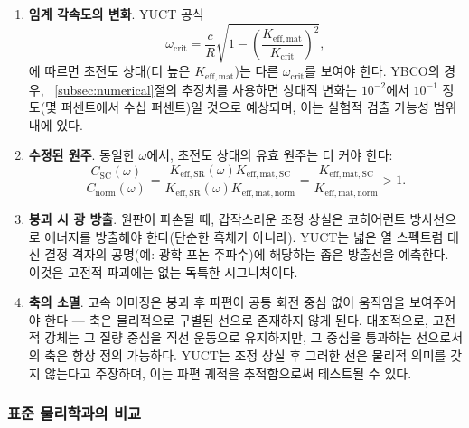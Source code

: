 \documentclass[12pt,a4paper]{article}
\begin{document}
	\begin{enumerate}
		\item \textbf{임계 각속도의 변화}. YUCT 공식
		\[
		\omega_{\text{crit}} = \frac{c}{R}\sqrt{1 - \left(\frac{K_{\mathrm{eff,mat}}}{K_{\mathrm{crit}}}\right)^2},
		\]
		에 따르면 초전도 상태(더 높은 \(K_{\mathrm{eff,mat}}\))는 다른 \(\omega_{\text{crit}}\)를 보여야 한다. YBCO의 경우, ~\ref{subsec:numerical}절의 추정치를 사용하면 상대적 변화는 \(10^{-2}\)에서 \(10^{-1}\) 정도(몇 퍼센트에서 수십 퍼센트)일 것으로 예상되며, 이는 실험적 검출 가능성 범위 내에 있다.
		
		\item \textbf{수정된 원주}. 동일한 \(\omega\)에서, 초전도 상태의 유효 원주는 더 커야 한다:
		\[
		\frac{C_{\text{SC}}(\omega)}{C_{\text{norm}}(\omega)} = \frac{K_{\mathrm{eff,SR}}(\omega) K_{\mathrm{eff,mat,SC}}}{K_{\mathrm{eff,SR}}(\omega) K_{\mathrm{eff,mat,norm}}} = \frac{K_{\mathrm{eff,mat,SC}}}{K_{\mathrm{eff,mat,norm}}} > 1.
		\]
		
		\item \textbf{붕괴 시 광 방출}. 원판이 파손될 때, 갑작스러운 조정 상실은 코히어런트 방사선으로 에너지를 방출해야 한다(단순한 흑체가 아니라). YUCT는 넓은 열 스펙트럼 대신 결정 격자의 공명(예: 광학 포논 주파수)에 해당하는 좁은 방출선을 예측한다. 이것은 고전적 파괴에는 없는 독특한 시그니처이다.
		
		\item \textbf{축의 소멸}. 고속 이미징은 붕괴 후 파편이 공통 회전 중심 없이 움직임을 보여주어야 한다 — 축은 물리적으로 구별된 선으로 존재하지 않게 된다. 대조적으로, 고전적 강체는 그 질량 중심을 직선 운동으로 유지하지만, 그 중심을 통과하는 선으로서의 축은 항상 정의 가능하다. YUCT는 조정 상실 후 그러한 선은 물리적 의미를 갖지 않는다고 주장하며, 이는 파편 궤적을 추적함으로써 테스트될 수 있다.
	\end{enumerate}
	
	\subsubsection{표준 물리학과의 비교}
	
\end{document}
